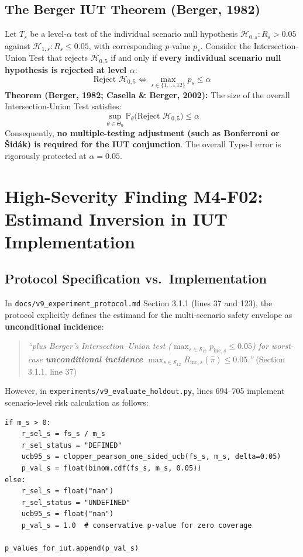 \documentclass[10pt,a4paper]{article}
\begin{document}
\subsection{The Berger IUT Theorem (Berger, 1982)}
Let $T_s$ be a level-$\alpha$ test of the individual scenario null hypothesis $\mathcal{H}_{0, s}: R_s > 0.05$ against $\mathcal{H}_{1, s}: R_s \le 0.05$, with corresponding $p$-value $p_s$. Consider the Intersection-Union Test that rejects $\mathcal{H}_{0,5}$ if and only if \textbf{every individual scenario null hypothesis is rejected at level $\alpha$}:
\begin{equation}
\text{Reject } \mathcal{H}_{0,5} \iff \max_{s \in \{1, \dots, 12\}} p_s \le \alpha
\end{equation}
\textbf{Theorem (Berger, 1982; Casella \& Berger, 2002):}  
The size of the overall Intersection-Union Test satisfies:
\begin{equation}
\sup_{\theta \in \Theta_0} \mathbb{P}_\theta\big(\text{Reject } \mathcal{H}_{0,5}\big) \le \alpha
\end{equation}
Consequently, \textbf{no multiple-testing adjustment (such as Bonferroni or Šidák) is required for the IUT conjunction}. The overall Type-I error is rigorously protected at $\alpha = 0.05$.

\section{High-Severity Finding M4-F02: Estimand Inversion in IUT Implementation}

\subsection{Protocol Specification vs.\ Implementation}
In \texttt{docs/v9\_experiment\_protocol.md} Section 3.1.1 (lines 37 and 123), the protocol explicitly defines the estimand for the multi-scenario safety envelope as \textbf{unconditional incidence}:
\begin{quote}
\textit{``plus Berger's Intersection--Union test ($\max_{s \in \mathcal{S}_{12}} p_{\mathrm{inc}, s} \le 0.05$) for worst-case \textbf{unconditional incidence} $\max_{s \in \mathcal{S}_{12}} R_{\mathrm{inc}, s}(\hat{\pi}) \le 0.05$.''} (Section 3.1.1, line 37)
\end{quote}
However, in \texttt{experiments/v9\_evaluate\_holdout.py}, lines 694--705 implement scenario-level risk calculation as follows:
\begin{verbatim}
if m_s > 0:
    r_sel_s = fs_s / m_s
    r_sel_status = "DEFINED"
    ucb95_s = clopper_pearson_one_sided_ucb(fs_s, m_s, delta=0.05)
    p_val_s = float(binom.cdf(fs_s, m_s, 0.05))
else:
    r_sel_s = float("nan")
    r_sel_status = "UNDEFINED"
    ucb95_s = float("nan")
    p_val_s = 1.0  # conservative p-value for zero coverage

p_values_for_iut.append(p_val_s)
\end{verbatim}
\end{document}
